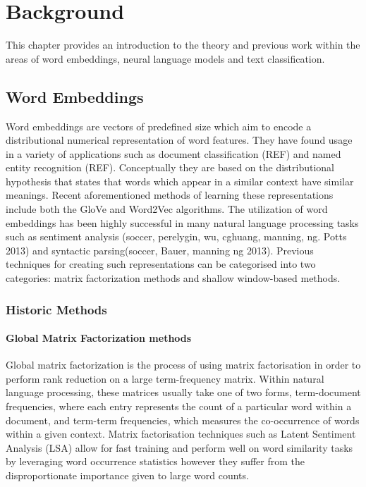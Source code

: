 \chapter{Background}
\label{chap:background}
This chapter provides an introduction to the theory and previous work within the areas of word embeddings, neural language models and text classification. 

\section{Word Embeddings}
Word embeddings are vectors of predefined size which aim to encode a distributional numerical representation of word features. They have found usage in a variety of applications such as document classification (REF) and named entity recognition (REF). Conceptually they are based on the distributional hypothesis that states that words which appear in a similar context have similar meanings. Recent aforementioned methods of learning these representations include both the GloVe and Word2Vec algorithms.
The utilization of word embeddings has been highly successful in many natural language processing tasks such as sentiment analysis (soccer, perelygin, wu, cghuang, manning, ng. Potts 2013) and syntactic parsing(soccer, Bauer, manning  ng 2013). Previous techniques for creating such representations can be categorised into two categories: matrix factorization methods and shallow window-based methods.
\subsection{Historic Methods}
\subsubsection{Global Matrix Factorization methods}
Global matrix factorization is the process of using matrix factorisation in order to perform rank reduction on a large term-frequency matrix. Within natural language processing, these matrices usually take one of two forms, term-document frequencies, where each entry represents the count of a particular word within a document, and term-term frequencies, which measures the co-occurrence of words within a given context. Matrix factorisation techniques such as Latent Sentiment Analysis (LSA) allow for fast training and perform well on word similarity tasks by leveraging word occurrence statistics however they suffer from the disproportionate importance given to large word counts.
